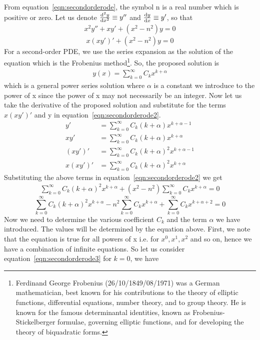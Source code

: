 From equation~\eqref{eqn:secondorderode}, the symbol n is a real number which is positive or zero. Let us denote $\derivative[2]{y}{x} \equiv y''$ and $\derivative{y}{x} \equiv y'$, so that
\begin{align*}
x^2y'' + xy' + (x^2 - n^2)y = 0
\end{align*}
\begin{equation}
x(xy')' + (x^2 - n^2)y = 0
\label{eqn:secondorderode2}
\end{equation} 
For a second-order PDE, we use the series expansion as the solution of the equation which is the Frobenius method\footnote{
Ferdinand George Frobenius  (26/10/1849/08/1971) was a German mathematician, best known for his contributions to the theory of elliptic functions, differential equations, number theory, and to group theory. He is known for the famous determinantal identities, known as Frobenius- Stickelberger formulae, governing elliptic functions, and for developing the theory of biquadratic forms.
}. So, the proposed solution is 
\begin{align}
y(x) = \sum_{k=0}^{\infty}C_k x^{k + \alpha}
\label{eqn:besselfunctionsoln}
\end{align}
which is a general power series solution where $\alpha$ is a constant we introduce to the power of x since the power of x may not necessarily be an integer. Now let us take the derivative of the proposed solution and substitute for the terms $x(xy')'$ and y in equation~\eqref{eqn:secondorderode2}.
\begin{align*}
y' &= \sum_{k=0}^{\infty}C_k (k + \alpha) x^{k + \alpha - 1}\\
xy' &= \sum_{k=0}^{\infty}C_k (k + \alpha) x^{k + \alpha}\\
(xy')' &= \sum_{k=0}^{\infty}C_k (k + \alpha)^2 x^{k + \alpha - 1}\\
x(xy')' &= \sum_{k=0}^{\infty}C_k (k + \alpha)^2 x^{k + \alpha}
\end{align*}
Substituting the above terms in equation~\eqref{eqn:secondorderode2} we get
\begin{align*}
\sum_{k=0}^{\infty}C_k (k + \alpha)^2 x^{k + \alpha} + (x^2 - n^2)\sum_{k=0}^{\infty}C_k x^{k + \alpha} = 0
\end{align*}
\begin{dmath}
\sum_{k=0}^{\infty}C_k (k + \alpha)^2 x^{k + \alpha} - n^2\sum_{k=0}^{\infty}C_k x^{k + \alpha} + \sum_{k=0}^{\infty}C_k x^{k + \alpha + 2} = 0
\label{eqn:secondorderode3}
\end{dmath}
Now we need to determine the various coefficient $C_k$ and the term $\alpha$ we have introduced. The values will be determined by the equation above. First, we note that the equation is true for all powers of x i.e. for $x^0, x^1, x^2$ and so on, hence we have a combination of infinite equations. So let us consider equation~\eqref{eqn:secondorderode3} for $k=0$, we have 
